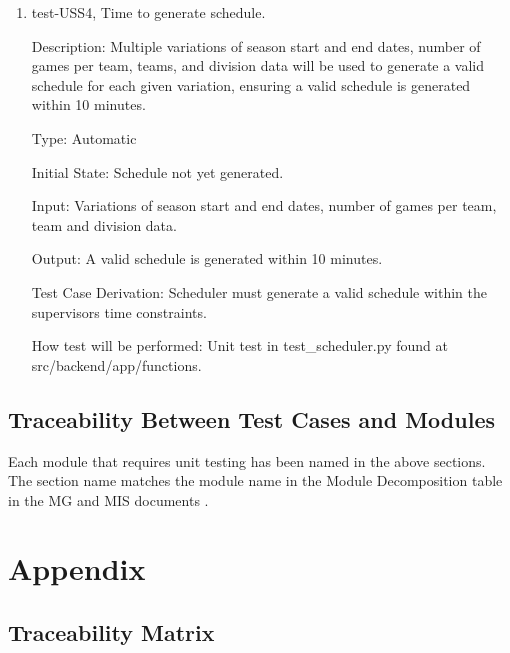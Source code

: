 \documentclass[12pt, titlepage]{article}
\begin{document}
\begin{enumerate}

\item{test-USS4, Time to generate schedule.\\}

Description: Multiple variations of season start and end dates, number of games
per team, teams, and division data will be used to generate a valid schedule
for each given variation, ensuring a valid schedule is generated within 10 minutes.

Type: Automatic

Initial State: Schedule not yet generated.

Input: Variations of season start and end dates, number of games per
team, team and division data.

Output: A valid schedule is generated within 10 minutes.

Test Case Derivation: Scheduler must generate a valid schedule within the
supervisors time constraints.

How test will be performed: Unit test in test\_scheduler.py found at
src/backend/app/functions.

\end{enumerate}

\subsection{Traceability Between Test Cases and Modules}


Each module that requires unit testing has been named in the above sections.
The section name matches the module name in the Module Decomposition table in
the MG and MIS documents \cite{MG} \cite{MIS}.





\newpage

\section{Appendix}

\subsection{Traceability Matrix}
\end{document}
